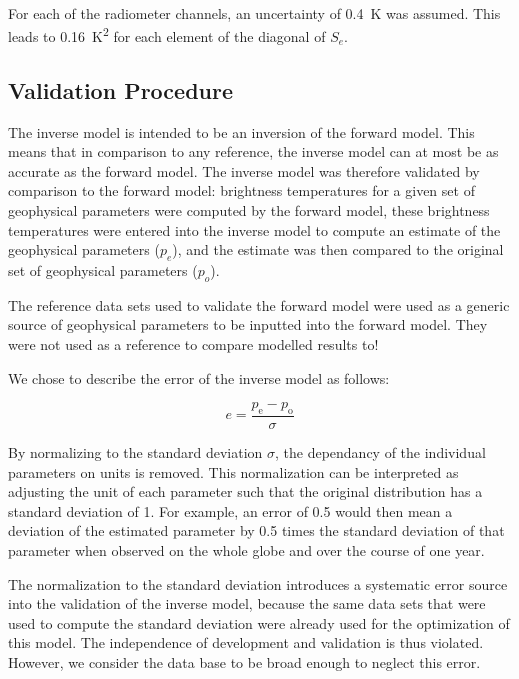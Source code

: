 \documentclass[11pt, a4paper]{article}
\begin{document}
\ \\
For each of the radiometer channels, an uncertainty of \SI{0.4}{K} was assumed. This leads to \SI{0.16}{K^2} for each element of the diagonal of \(S_e\).


\subsection{Validation Procedure}

The inverse model is intended to be an inversion of the forward model. This means that in comparison to any reference, the inverse model can at most be as accurate as the forward model. The inverse model was therefore validated by comparison to the forward model: brightness temperatures for a given set of geophysical parameters were computed by the forward model, these brightness temperatures were entered into the inverse model to compute an estimate of the geophysical parameters (\(p_e\)), and the estimate was then compared to the original set of geophysical parameters (\(p_o\)).
\newline

The reference data sets used to validate the forward model were used as a generic source of geophysical parameters to be inputted into the forward model. They were not used as a reference to compare modelled results to!
\newline

We chose to describe the error of the inverse model as follows:

\begin{equation*}
e = \frac{p_\text{e} - p_\text{o}}{\sigma}
\end{equation*}

By normalizing to the standard deviation \(\sigma\), the dependancy of the individual parameters on units is removed. This normalization can be interpreted as adjusting the unit of each parameter such that the original distribution has a standard deviation of 1. For example, an error of 0.5 would then mean a deviation of the estimated parameter by 0.5 times the standard deviation of that parameter when observed on the whole globe and over the course of one year.
\newline

The normalization to the standard deviation introduces a systematic error source into the validation of the inverse model, because the same data sets that were used to compute the standard deviation were already used for the optimization of this model. The independence of development and validation is thus violated. However, we consider the data base to be broad enough to neglect this error.
\end{document}
